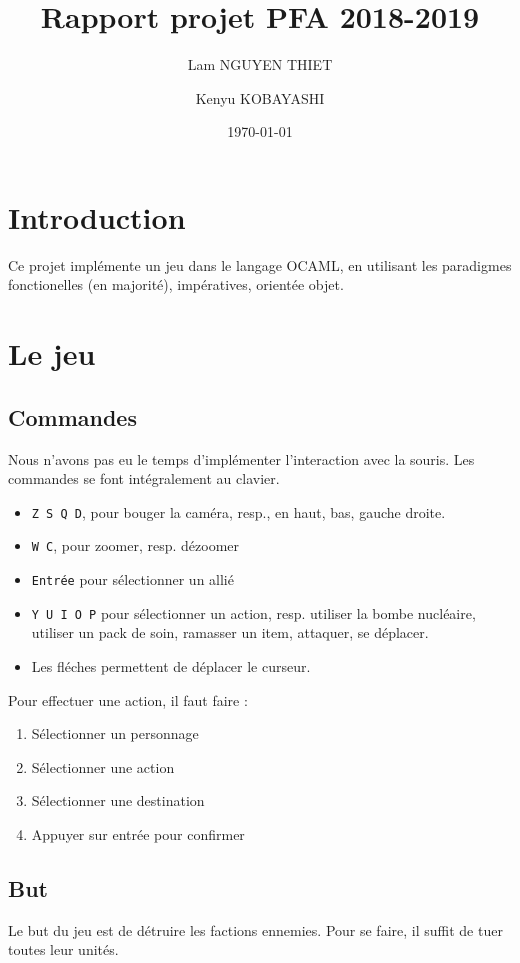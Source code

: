 \documentclass{article}
\title{Rapport projet PFA 2018-2019}
\date{\today}
\author{Lam NGUYEN THIET
\and Kenyu KOBAYASHI}
\begin{document}
\maketitle
\tableofcontents
\newpage
\newpage
\section{Introduction}
Ce projet implémente un jeu dans le langage OCAML, en utilisant les paradigmes fonctionelles (en majorité), impératives, orientée objet.

\section{Le jeu}
\subsection{Commandes}
Nous n'avons pas eu le temps d'implémenter l'interaction avec la souris. Les commandes se font intégralement
au clavier.
\begin{itemize}
    \item \texttt{Z S Q D}, pour bouger la caméra, resp., en haut, bas, gauche droite.
    \item \texttt{W C}, pour zoomer, resp. dézoomer
    \item \texttt{Entrée} pour sélectionner un allié
    \item \texttt{Y U I O P} pour sélectionner un action, resp. utiliser la bombe nucléaire, utiliser un pack de soin, ramasser un item, attaquer, se déplacer.
    \item Les fléches permettent de déplacer le curseur.
\end{itemize}

Pour effectuer une action, il faut faire :
\begin{enumerate}
    \item Sélectionner un personnage
    \item Sélectionner une action
    \item Sélectionner une destination
    \item Appuyer sur entrée pour confirmer
    
\end{enumerate}
\subsection{But}
Le but du jeu est de détruire les factions ennemies. Pour se faire, il suffit de tuer toutes leur unités.
\end{document}
